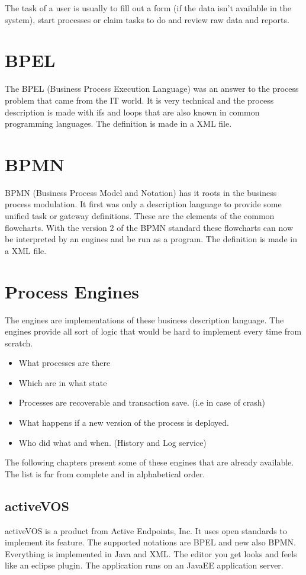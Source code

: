 \documentclass[paper=a4,twoside=false,BCOR=0mm,DIV=calc,fontsize=12pt]{scrartcl}
\begin{document}
The task of a user is usually to fill out a form (if the data isn't available in the system), start processes or claim tasks to do and review raw data and reports.

\section{BPEL}
The BPEL (Business Process Execution Language) \cite{bpel} was an answer to the process problem that came from the IT world. It is very technical and the process description is made with ifs and loops that are also known in common programming languages. The definition is made in a XML file. 

\section{BPMN}
BPMN (Business Process Model and Notation) \cite{bpmn} has it roots in the business process modulation. It first was only a description language to provide some unified task or gateway definitions. These are the elements of the common flowcharts. 
With the version 2 of the BPMN standard these flowcharts can now be interpreted by an engines and be run as a program.
The definition is made in a XML file. 

\section{Process Engines}
The engines are implementations of these business description language. The engines provide all sort of logic that would be hard to implement every time from scratch.
\begin{itemize}
  \item What processes are there
  \item Which are in what state
  \item Processes are recoverable and transaction save. (i.e in case of crash)
  \item What happens if a new version of the process is deployed.
  \item Who did what and when. (History and Log service)
\end{itemize}

The following chapters present some of these engines that are already available. The list is far from complete and in alphabetical order.

\subsection{activeVOS}
activeVOS \cite{activevos} is a product from Active Endpoints, Inc. It uses open standards to implement its feature. The supported notations are BPEL and new also BPMN. Everything is implemented in Java and XML. The editor you get looks and feels like an eclipse plugin. The application runs on an JavaEE application server.
\end{document}
